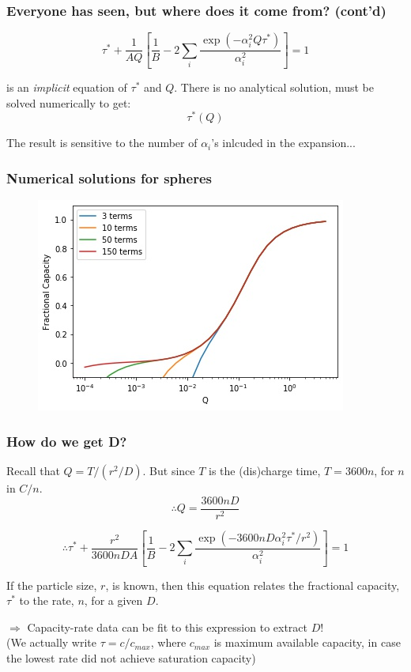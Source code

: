 \documentclass{beamer}
\begin{document}
\begin{frame}
\frametitle{Everyone has seen, but where does it come from? (cont'd)}

\begin{equation*}
\tau^* + \frac{1}{AQ} \left[ \frac{1}{B} - 2 \sum_{i}\frac{\exp(-\alpha_i^2 Q\tau^*)}{\alpha_i^2}  \right] = 1
\end{equation*}

is an \emph{implicit} equation of $\tau^*$ and $Q$. There is no analytical solution, must be solved numerically to get: \\
\begin{equation*}
\tau^*(Q)
\end{equation*}

The result is sensitive to the number of $\alpha_i$'s inlcuded in the expansion...

\end{frame}

\begin{frame}
\frametitle{Numerical solutions for spheres}

\begin{figure}
	\includegraphics[width=0.65\linewidth]{figs/Atlung_spheres_alpha_expansion.jpg}
\end{figure}

\end{frame}

\begin{frame}
\frametitle{How do we get D?}

Recall that $Q=T/(r^2/D)$. But since $T$ is the (dis)charge time, $T=3600n$, for $n$ in $C/n$. 
\begin{equation*}
\therefore Q = \frac{3600nD}{r^2}
\end{equation*} 

\begin{equation*}
\therefore \tau^* + \frac{r^2}{3600nDA} \left[ \frac{1}{B} - 2 \sum_{i}\frac{\exp(-3600nD\alpha_i^2 \tau^*/r^2)}{\alpha_i^2}  \right] = 1
\end{equation*}

If the particle size, $r$, is known, then this equation relates the fractional capacity, $\tau^*$ to the rate, $n$, for a given $D$.

$\Rightarrow$ Capacity-rate data can be fit to this expression to extract $D$! \\
(We actually write $\tau=c/c_{max}$, where $c_{max}$ is maximum available capacity, in case the lowest rate did not achieve saturation capacity)

\end{frame}
\end{document}
